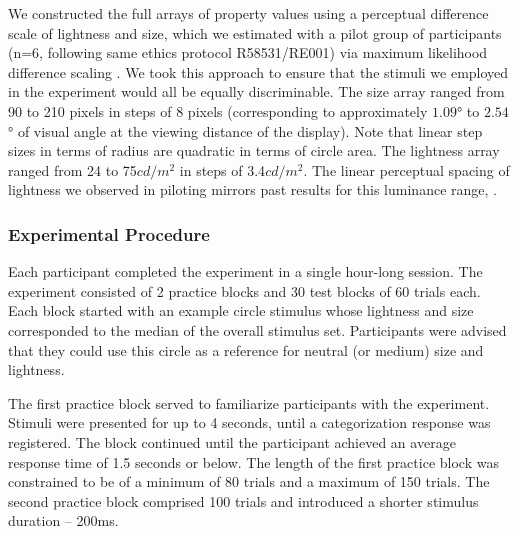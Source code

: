 \documentclass[a4paper, nobind]{templates/ociamthesis}
\begin{document}
We constructed the full arrays of property values using a perceptual difference scale of lightness and size, which we estimated with a pilot group of participants (n=6, following same ethics protocol R58531/RE001) via maximum likelihood difference scaling \autocites[MLDS,][see Experiment 2 for details on this method]{maloney2003,knoblauch2008}. We took this approach to ensure that the stimuli we employed in the experiment would all be equally discriminable. The size array ranged from 90 to 210 pixels in steps of 8 pixels (corresponding to approximately \(1.09\)° to \(2.54\)° of visual angle at the viewing distance of the display). Note that linear step sizes in terms of radius are quadratic in terms of circle area. The lightness array ranged from 24 to 75\(cd/m^2\) in steps of 3.4\(cd/m^2\). The linear perceptual spacing of lightness we observed in piloting mirrors past results for this luminance range, \autocites[e.g.][]{wiebel2017,rogers2016}.

\hypertarget{experimental-procedure-3}{%
\subsubsection{Experimental Procedure}\label{experimental-procedure-3}}

Each participant completed the experiment in a single hour-long session. The experiment consisted of 2 practice blocks and 30 test blocks of 60 trials each. Each block started with an example circle stimulus whose lightness and size corresponded to the median of the overall stimulus set. Participants were advised that they could use this circle as a reference for neutral (or medium) size and lightness.

The first practice block served to familiarize participants with the experiment. Stimuli were presented for up to 4 seconds, until a categorization response was registered. The block continued until the participant achieved an average response time of 1.5 seconds or below. The length of the first practice block was constrained to be of a minimum of 80 trials and a maximum of 150 trials. The second practice block comprised 100 trials and introduced a shorter stimulus duration -- 200ms.
\end{document}
